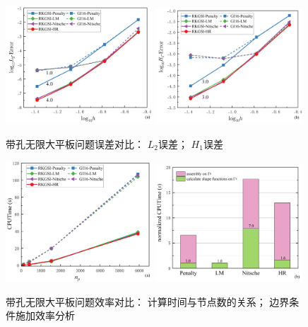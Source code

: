 \begin{figure}[H]
\centering
\begin{subcaptiongroup}
        \includegraphics[width=0.49\textwidth]{figure/EHR/hole/L2.png}
        \label{HL2}
        \includegraphics[width=0.49\textwidth]{figure/EHR/hole/H1.png}
        \label{HH1}
        \end{subcaptiongroup}
    \caption{带孔无限大平板问题误差对比： $L_2$误差； $H_1$误差}
    \end{figure}
\begin{figure}[H]
\centering
    \begin{subcaptiongroup}
    \includegraphics[width=0.49\textwidth]{figure/EHR/hole/cputime.png}
    \label{Hcputime}
    \includegraphics[width=0.49\textwidth]{figure/EHR/hole/efficiency.png}
    \label{Hefficiency}
\end{subcaptiongroup}
\caption{带孔无限大平板问题效率对比： 计算时间与节点数的关系； 边界条件施加效率分析}
\end{figure}
